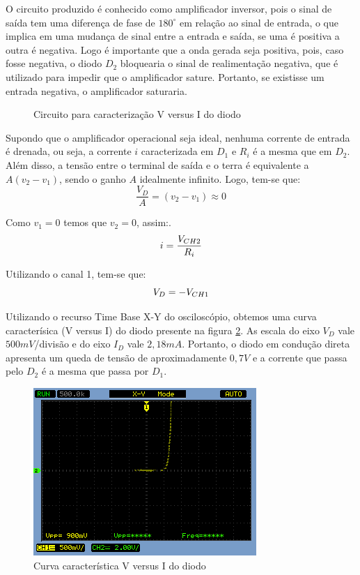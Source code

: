 \documentclass[a4paper]{article} %
\begin{document}
O circuito produzido é conhecido como amplificador inversor, pois o sinal de saída tem uma diferença de fase de $180^{\circ}$ em relação ao sinal de entrada, o que implica em uma mudança de sinal entre a entrada e saída, se uma é positiva a outra é negativa. Logo é importante que a onda gerada seja positiva, pois, caso fosse negativa, o diodo $D_2$ bloquearia o sinal de realimentação negativa, que é utilizado para impedir que o amplificador sature. Portanto, se existisse um entrada negativa, o amplificador saturaria.

\vspace{3mm}
\begin{figure}[h]
\centerline{}
\caption{Circuito para caracterização V versus I do diodo \label{circ:1}}
\end{figure}

Supondo que o amplificador operacional seja ideal, nenhuma corrente de entrada é drenada, ou seja, a corrente $i$ caracterizada em $D_1$ e $R_i$ é a mesma que em $D_2$. Além disso, a tensão entre o terminal de saída e o terra é equivalente a $A(v_2-v_1)$, sendo o ganho $A$ idealmente infinito. Logo, tem-se que:
\begin{equation}
\frac{V_D}{A}=(v_2-v_1)\approx0
\end{equation}

Como $v_1=0$ temos que $v_2=0$, assim:.
\begin{equation}
i=\frac{V_{CH2}}{R_{i}}\\
\end{equation}

Utilizando o canal 1, tem-se que:  
\begin{equation}
V_D=-V_{CH1}\\
\end{equation}


Utilizando o recurso Time Base X-Y do osciloscópio, obtemos uma curva caracterísica (V versus I) do diodo presente na figura \ref{fig:q1-curva2}. As escala do eixo $V_D$ vale $500mV$/divisão e do eixo $I_D$ vale $2,18mA$. Portanto, o diodo em condução direta apresenta um queda de tensão de aproximadamente $0,7V$ e a corrente que passa pelo $D_2$ é a mesma que passa por $D_1$.    
\begin{figure}[h]
\begin{centering}
\includegraphics[scale=0.5]{Imagens/3.1/NewFile0} \caption{Curva característica V versus I do diodo  \label{fig:q1-curva2}}
\par\end{centering}
\end{figure}
\end{document}

